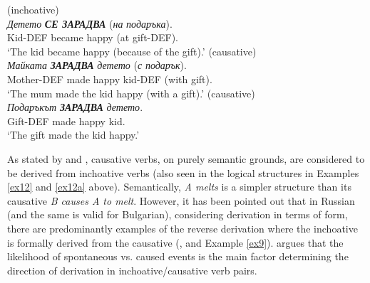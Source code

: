 \documentclass[output=paper,colorlinks,citecolor=brown]{langscibook}
\begin{document}
 \begin{exe}
 \ex \label{ex8}
     \begin{xlist}
         \ex \label{ex8a}(inchoative) \\
         \gll \textit{Детето} \textit{\textbf{СЕ ЗАРАДВА}} (\textit{на} \textit{подаръка}). \\
		Kid-DEF {became happy} (at gift-DEF). \\
		\glt `The kid became happy (because of the gift).'
\newpage
         \ex \label{ex8b}(causative) \\
         \gll \textit{Майката} \textit{\textbf{ЗАРАДВА}} \textit{детето} (\textit{с} \textit{подарък}). \\
		Mother-DEF {made happy} kid-DEF (with gift). \\
		\glt `The mum made the kid happy (with a gift).'
         \ex \label{ex8c}(causative) \\
         \gll \textit{Подаръкът} \textit{\textbf{ЗАРАДВА}} \textit{детето}. \\
		Gift-DEF {made happy} kid. \\
		\glt `The gift made the kid happy.'
     \end{xlist}
\end{exe}


As stated by \citet[352--353]{Melcuk1967} and \citet[89]{Haspelmath1993}, causative verbs, on purely semantic grounds, are considered to be derived from inchoative verbs (also seen in the logical structures in Examples \ref{ex12} and \ref{ex12a} above). Semantically, \textit{A melts} is a simpler structure than its causative \textit{B causes A to melt}. However, it has been pointed out that in Russian (and the same is valid for Bulgarian), considering derivation in terms of form, there are predominantly examples of the reverse derivation where the inchoative is formally derived from the causative (\cite[89]{Haspelmath1993}, and Example \ref{ex9}). \citet[103--106]{Haspelmath1993} argues that the likelihood of spontaneous vs. caused events is the main factor determining the direction of derivation in inchoative/causative verb pairs. 
\end{document}
